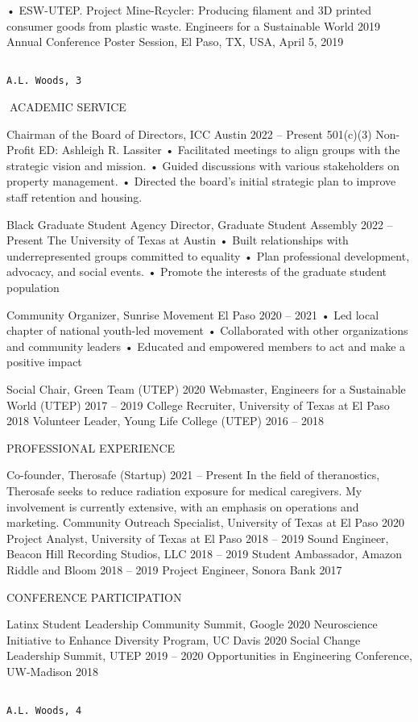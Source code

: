 \documentclass[
]{article}
\begin{document}
• ESW-UTEP. Project Mine-Rcycler: Producing filament and 3D printed
consumer goods from plastic waste. Engineers for a Sustainable World
2019 Annual Conference Poster Session, El Paso, TX, USA, April 5, 2019

\begin{verbatim}
                                                                                        A.L. Woods, 3
\end{verbatim}

ACADEMIC SERVICE

Chairman of the Board of Directors, ICC Austin 2022 -- Present 501(c)(3)
Non-Profit \textbar{} ED: Ashleigh R. Lassiter • Facilitated meetings to
align groups with the strategic vision and mission. • Guided discussions
with various stakeholders on property management. • Directed the board's
initial strategic plan to improve staff retention and housing.

Black Graduate Student Agency Director, Graduate Student Assembly 2022
-- Present The University of Texas at Austin • Built relationships with
underrepresented groups committed to equality • Plan professional
development, advocacy, and social events. • Promote the interests of the
graduate student population

Community Organizer, Sunrise Movement El Paso 2020 -- 2021 • Led local
chapter of national youth-led movement • Collaborated with other
organizations and community leaders • Educated and empowered members to
act and make a positive impact

Social Chair, Green Team (UTEP) 2020 Webmaster, Engineers for a
Sustainable World (UTEP) 2017 -- 2019 College Recruiter, University of
Texas at El Paso 2018 Volunteer Leader, Young Life College (UTEP) 2016
-- 2018

PROFESSIONAL EXPERIENCE

Co-founder, Therosafe (Startup) 2021 -- Present In the field of
theranostics, Therosafe seeks to reduce radiation exposure for medical
caregivers. My involvement is currently extensive, with an emphasis on
operations and marketing. Community Outreach Specialist, University of
Texas at El Paso 2020 Project Analyst, University of Texas at El Paso
2018 -- 2019 Sound Engineer, Beacon Hill Recording Studios, LLC 2018 --
2019 Student Ambassador, Amazon \textbar{} Riddle and Bloom 2018 -- 2019
Project Engineer, Sonora Bank 2017

CONFERENCE PARTICIPATION

Latinx Student Leadership Community Summit, Google 2020 Neuroscience
Initiative to Enhance Diversity Program, UC Davis 2020 Social Change
Leadership Summit, UTEP 2019 -- 2020 Opportunities in Engineering
Conference, UW-Madison 2018

\begin{verbatim}
                                                                                             A.L. Woods, 4
\end{verbatim}


\end{document}
